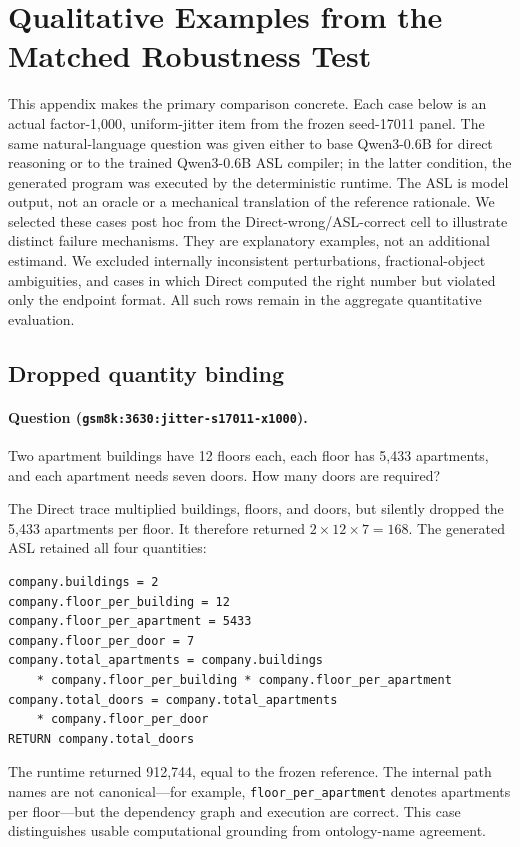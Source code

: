 \documentclass[11pt]{article}
\begin{document}
\appendix
\section{Qualitative Examples from the Matched Robustness Test}
\label{app:qualitative-robustness}

This appendix makes the primary comparison concrete.  Each case below is an
actual factor-1,000, uniform-jitter item from the frozen seed-17011 panel.  The
same natural-language question was given either to base Qwen3-0.6B for direct
reasoning or to the trained Qwen3-0.6B ASL compiler; in the latter condition,
the generated program was executed by the deterministic runtime.  The ASL is
model output, not an oracle or a mechanical translation of the reference
rationale.  We selected these cases post hoc from the Direct-wrong/ASL-correct
cell to illustrate distinct failure mechanisms.  They are explanatory examples,
not an additional estimand.  We excluded internally inconsistent perturbations,
fractional-object ambiguities, and cases in which Direct computed the right
number but violated only the endpoint format.  All such rows remain in the
aggregate quantitative evaluation.

\subsection{Dropped quantity binding}

\paragraph{Question (\texttt{gsm8k:3630:jitter-s17011-x1000}).}
Two apartment buildings have 12 floors each, each floor has 5,433 apartments,
and each apartment needs seven doors.  How many doors are required?

The Direct trace multiplied buildings, floors, and doors, but silently dropped
the 5,433 apartments per floor.  It therefore returned
$2\mathbin{\times}12\mathbin{\times}7=168$.  The generated ASL retained all four
quantities:
\begin{verbatim}
company.buildings = 2
company.floor_per_building = 12
company.floor_per_apartment = 5433
company.floor_per_door = 7
company.total_apartments = company.buildings
    * company.floor_per_building * company.floor_per_apartment
company.total_doors = company.total_apartments
    * company.floor_per_door
RETURN company.total_doors
\end{verbatim}
The runtime returned 912,744, equal to the frozen reference.  The internal path
names are not canonical---for example, \texttt{floor\_per\_apartment} denotes
apartments per floor---but the dependency graph and execution are correct.  This
case distinguishes usable computational grounding from ontology-name agreement.
\end{document}
